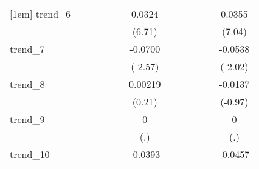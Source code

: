 {\begin{tabular}{l*{12}{c}}
[1em]
trend\_6     &                     &                     &                     &                     &                     &      0.0324\sym{***}&                     &                     &                     &                     &                     &      0.0355\sym{***}\\
            &                     &                     &                     &                     &                     &      (6.71)         &                     &                     &                     &                     &                     &      (7.04)         \\
[1em]
trend\_7     &                     &                     &                     &                     &                     &     -0.0700\sym{*}  &                     &                     &                     &                     &                     &     -0.0538\sym{*}  \\
            &                     &                     &                     &                     &                     &     (-2.57)         &                     &                     &                     &                     &                     &     (-2.02)         \\
[1em]
trend\_8     &                     &                     &                     &                     &                     &     0.00219         &                     &                     &                     &                     &                     &     -0.0137         \\
            &                     &                     &                     &                     &                     &      (0.21)         &                     &                     &                     &                     &                     &     (-0.97)         \\
[1em]
trend\_9     &                     &                     &                     &                     &                     &           0         &                     &                     &                     &                     &                     &           0         \\
            &                     &                     &                     &                     &                     &         (.)         &                     &                     &                     &                     &                     &         (.)         \\
[1em]
trend\_10    &                     &                     &                     &                     &                     &     -0.0393\sym{***}&                     &                     &                     &                     &                     &     -0.0457\sym{***}\\

\end{tabular}}
